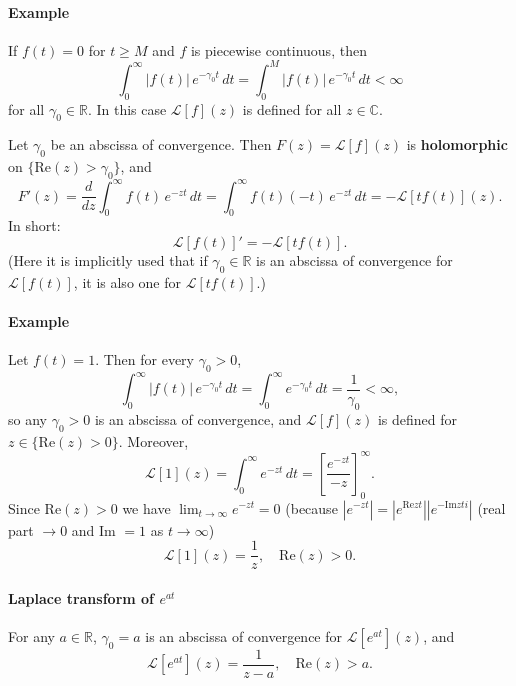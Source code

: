 \paragraph{Example}

\begin{example}
If $f(t) = 0$ for $t \geq M$ and $f$ is piecewise continuous, then
\[
\int_0^{\infty} |f(t)|\, e^{-\gamma_0 t}\, dt = \int_0^{M} |f(t)|\, e^{-\gamma_0 t}\, dt < \infty
\]
for all $\gamma_0 \in \mathbb{R}$. In this case $\mathcal{L}[f](z)$ is defined for all $z \in \mathbb{C}$.
\end{example}

\begin{remark}
Let $\gamma_0$ be an abscissa of convergence. Then $F(z) = \mathcal{L}[f](z)$ is \textbf{holomorphic} on $\{\mathrm{Re}(z) > \gamma_0\}$, and
\[
F'(z) = \frac{d}{dz}\int_0^{\infty} f(t)\, e^{-zt}\, dt = \int_0^{\infty} f(t)(-t)\, e^{-zt}\, dt = -\mathcal{L}[tf(t)](z).
\]
In short:
\[
\boxed{\mathcal{L}[f(t)]' = -\mathcal{L}[t f(t)].}
\]
(Here it is implicitly used that if $\gamma_0 \in \mathbb{R}$ is an abscissa of convergence for $\mathcal{L}[f(t)]$, it is also one for $\mathcal{L}[tf(t)]$.)
\end{remark}

\paragraph{Example}

\begin{example}
Let $f(t) = 1$. Then for every $\gamma_0 > 0$,
\[
\int_0^{\infty} |f(t)|\, e^{-\gamma_0 t}\, dt = \int_0^{\infty} e^{-\gamma_0 t}\, dt = \frac{1}{\gamma_0} < \infty,
\]
so any $\gamma_0 > 0$ is an abscissa of convergence, and $\mathcal{L}[f](z)$ is defined for $z \in \{\mathrm{Re}(z) > 0\}$. Moreover,
\[
\mathcal{L}[1](z) = \int_0^{\infty} e^{-zt}\, dt = \left[\frac{e^{-zt}}{-z}\right]_0^{\infty}.
\]
Since $\mathrm{Re}(z) > 0$ we have $\lim_{t \to \infty} e^{-zt} = 0$ (because $|e^{-zt}| = |e^{\mathrm{Re}zt}|  |e^{-\mathrm{Im}zti}|$ (real part $\to 0$ and Im $ = 1$ as $t \to \infty$)
\[
\boxed{\mathcal{L}[1](z) = \frac{1}{z}, \quad \mathrm{Re}(z) > 0.}
\]
\end{example}

\paragraph{Laplace transform of $e^{at}$}
For any $a \in \mathbb{R}$, $\gamma_0 = a$ is an abscissa of convergence for $\mathcal{L}[e^{at}](z)$, and
\[
\boxed{\mathcal{L}[e^{at}](z) = \frac{1}{z - a}, \quad \mathrm{Re}(z) > a.}
\]
